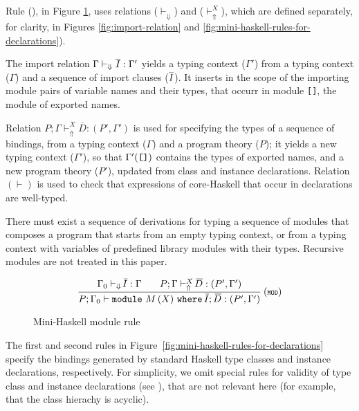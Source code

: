 Rule (\MODULE), in Figure \ref{fig:mini-haskell-module-rule}, uses
relations ($\vdash_{\Downarrow}$) and ($\vdash_{\Uparrow}^X$), which
are defined separately, for clarity, in Figures
\ref{fig:import-relation} and
\ref{fig:mini-haskell-rules-for-declarations}).

The import relation $\Gamma \vdash_{\Downarrow} \overline{I} :
\Gamma'$ yields a typing context ($\Gamma'$) from a typing context
($\Gamma$) and a sequence of import clauses ($\overline{I}$).
It inserts in the scope of the importing module pairs of variable
names and their types, that occurr in module {\tt []}, the module of
exported names. 

Relation $P;\Gamma \vdash_{\Uparrow}^X \overline{\!D}:(P',\Gamma')$ is
used for specifying the types of a sequence of bindings, from a typing
context ($\Gamma$) and a program theory ($P$); it yields a new typing
context ($\Gamma'$), so that $\Gamma'(\mbox{\tt{[]}})$ contains the
types of exported names, and a new program theory ($P'$), updated from
class and instance declarations. Relation $(\vdash)$ is used to
check that expressions of core-Haskell that occur in declarations are
well-typed.

There must exist a sequence of derivations for typing a sequence of
modules that composes a program that starts from an empty typing
context, or from a typing context with variables of predefined library
modules with their types. Recursive modules are not treated in this
paper.

\begin{figure}[b]
\[ \begin{array}{cc}
	\displaystyle\frac
	 {\begin{array}{ll}
           \Gamma_0 \vdash_{\Downarrow} \overline{\!I} : \Gamma\:\: & \:\:P;\Gamma \vdash_{\Uparrow}^X \overline{\!D} : (P',\Gamma') 
          \end{array}}
	 {P;\Gamma_0 \vdash \module\ M\, (\exportC)\ \where\ \overline{\!I};\, \overline{\!D} : (P',\Gamma')} \:(\MODULE)
\end{array} \]
\caption{Mini-Haskell module rule} 
\label{fig:mini-haskell-module-rule}
\end{figure}

The first and second rules in
Figure~\ref{fig:mini-haskell-rules-for-declarations} specify the
bindings generated by standard Haskell type classes and instance
declarations, respectively.  For simplicity, we omit special rules for
validity of type class and instance declarations (see \cite{GHC}),
that are not relevant here (for example, that the class hierachy is
acyclic).

